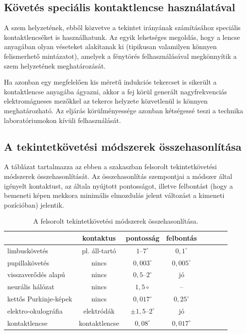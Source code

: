 \subsection{Követés speciális kontaktlencse használatával}\label{sect:kontakt}

A szem helyzetének, ebből közvetve a tekintet irányának számításához speciális kontaktlencséket is használhatunk. Az egyik lehetséges megoldás, hogy a lencse anyagában olyan véseteket alakítanak ki (tipikusan valamilyen könnyen felismerhető mintázatot), amelyek a fénytörés felhasználásával megkönnyítik a szem helyzetének meghatározását.

Ha azonban egy megfelelően kis méretű indukciós tekercset is sikerült a kontaktlencse anyagába ágyazni, akkor a fej körül generált nagyfrekvenciás elektromágneses mezőkkel az tekercs helyzete közvetlenül is könnyen meghatározható. Az eljárás körülményessége azonban kétségessé teszi a technika laboratóriumokon kívüli felhasználását.


\subsection{A tekintetkövetési módszerek összehasonlítása}\label{sect:tekintet_osszehas}

A  táblázat tartalmazza az ebben a szakaszban felsorolt tekintetkövetési módszerek összehasonlítását. Az összehasonlítás szempontjai a módszer által igényelt kontaktust, az általa nyújtott pontosságot, illetve felbontást (hogy a bemeneti képen mekkora minimális elmozdulás jelent változást a kimeneti pozícióban) jelentik. 

\begin{table}[ht]
	\centering
	\caption{A felsorolt tekintetkövetési módszerek összehasonlítása.} \label{tab:osszehas}
	\begin{tabular}{ l || c | c | c | c | c | c | c }
	 & kontaktus & pontosság & felbontás \\ \hline \hline
	limbuskövetés & pl. áll-tartó & $1$--$7^\circ$ & $0,\!1^\circ$ \\
	pupillakövetés & nincs & $0,\!003^\circ$ & $0,\!005^\circ$ \\
	visszaverődés alapú & nincs & $0,\!5$--$2^\circ$ & jó \\
	neurális hálózat & nincs & $1,\!5\circ$ & -- \\
	kettős Purkinje-képek & nincs & $0,\!017^\circ$ & $0,\!25^\circ$ \\ 
	elektro-okulográfia & elektródák & $\pm1,\!5$--$2^\circ$ & jó \\
	kontaktlencse & kontaktlencse & $0,\!08^\circ$ & $0,\!017^\circ$ \\
	\end{tabular}
\end{table}

